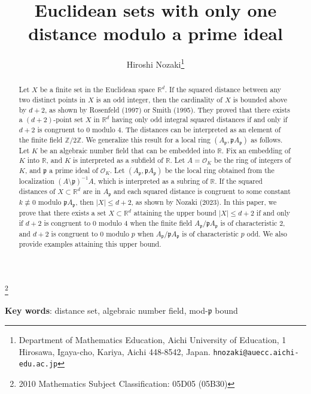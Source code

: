 \documentclass[a4paper, 11pt]{article}
\title{Euclidean sets with only one distance modulo a prime ideal}
\author{
Hiroshi Nozaki\thanks{Department of Mathematics Education, 
	Aichi University of Education, 
	1 Hirosawa, Igaya-cho, 
	Kariya, Aichi 448-8542, 
	Japan. {\tt hnozaki@auecc.aichi-edu.ac.jp}}}
\newcommand{\p}{\mathfrak{p}}
\newcommand{\Oc}{\mathcal{O}}
\theoremstyle{definition}
\begin{document}
\maketitle

\renewcommand{\thefootnote}{\fnsymbol{footnote}}
\footnote[0]{2010 Mathematics Subject Classification: 
05D05 (05B30)
}

\begin{abstract}
Let $X$ be a finite set in the Euclidean space $\mathbb{R}^d$. If the squared distance between any two distinct points in $X$ is an odd integer, then 
the cardinality of $X$ is bounded above by $d+2$, as shown by Rosenfeld (1997) or Smith (1995). 
They proved that there exists a $(d+2)$-point set $X$ in $\mathbb{R}^d$ having only odd integral squared distances if and only if $d+2$ is congruent to $0$ modulo $4$. 
The distances can be interpreted as an element of the finite field  $\mathbb{Z}/2\mathbb{Z}$. We generalize this result for a local ring $(A_\mathfrak{p},\mathfrak{p}A_\mathfrak{p})$ as follows. 
Let $K$ be an algebraic number field that can be embedded into $\mathbb{R}$. Fix an embedding of $K$ into $\mathbb{R}$, and $K$ is interpreted as a subfield of $\mathbb{R}$. 
Let $A=\Oc_K$ be the ring of integers of $K$, and $\mathfrak{p}$ a prime ideal of $\mathcal{O}_K$. Let $(A_\mathfrak{p},\mathfrak{p}A_\mathfrak{p})$ be the local ring obtained from the localization $(A\setminus \mathfrak{p})^{-1} A$, which is interpreted as a subring of $\mathbb{R}$. 
If the squared distances of $X\subset \mathbb{R}^d$ are in $A_\p$ and each squared distance is congruent to some constant $k \not\equiv 0 $ modulo $\p A_\p$, then $|X| \leq d+2$, as shown by Nozaki (2023). 
In this paper, 
we prove that there exists a set $X\subset \mathbb{R}^d$ attaining the upper bound $|X| \leq d+2$ if and only if $d+2$ is congruent to $0$ modulo $4$ when the finite field $A_\mathfrak{p}/ \mathfrak{p} A_\mathfrak{p}$ is of characteristic 2, and $d+2$ is congruent to $0$ modulo $p$ when $A_\mathfrak{p}/ \mathfrak{p} A_\mathfrak{p}$ is of characteristic $p$ odd. We also provide examples attaining this upper bound. 
 

\end{abstract}

\textbf{Key words}: 
distance set, algebraic number field, mod-$\mathfrak{p}$ bound
\end{document}
